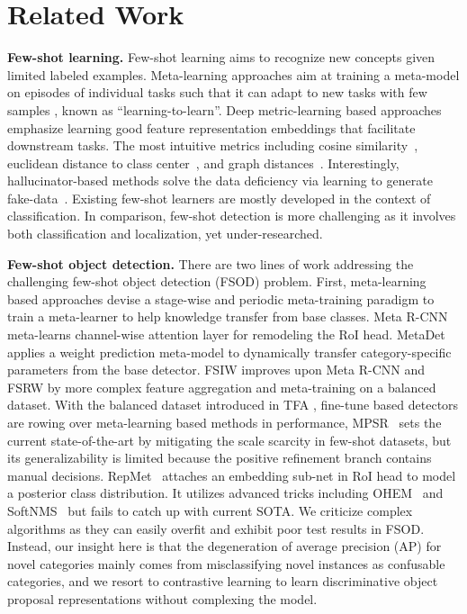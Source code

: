 \documentclass[final]{cvpr}
\begin{document}
\section{Related Work}

\textbf{Few-shot learning.} Few-shot learning aims to recognize new concepts given limited labeled examples. Meta-learning approaches aim at training a meta-model on episodes of individual tasks such that it can adapt to new tasks with few samples \cite{finn_model-agnostic_2017,ren_meta-learning_2018,sun_meta-transfer_nodate,khodadadeh_unsupervised_2019,ravi_optimization_2017,nichol_reptile_nodate,rusu_meta-learning_2018}, known as ``learning-to-learn''. Deep metric-learning based approaches emphasize learning good feature representation embeddings that facilitate downstream tasks. The most intuitive metrics including cosine similarity~\cite{cos_face,cos_softmax,chen_closer_2020,deng_arcface_2019}, euclidean distance to class center~\cite{snell_prototypical_2017}, and graph distances~\cite{garcia_few-shot_2018}. Interestingly, hallucinator-based methods solve the data deficiency via learning to generate fake-data~\cite{wang_low-shot_2018}. Existing few-shot learners are mostly developed in the context of classification. In comparison, few-shot detection is more challenging as it involves both classification and localization, yet under-researched.

\textbf{Few-shot object detection.} There are two lines of work addressing the challenging few-shot object detection (FSOD) problem. First, meta-learning based approaches devise a stage-wise and periodic meta-training paradigm to train a meta-learner to help knowledge transfer from base classes. Meta R-CNN \cite{yan_meta_2020} meta-learns channel-wise attention layer for remodeling the RoI head. MetaDet \cite{wang_meta-learning_2019} applies a weight prediction meta-model to dynamically transfer category-specific parameters from the base detector. FSIW \cite{xiao_few_shot_2020} improves upon Meta R-CNN and FSRW \cite{kang_few-shot_2019} by more complex feature aggregation and meta-training on a balanced dataset. With the balanced dataset introduced in TFA \cite{wang_frustratingly_2020}, fine-tune based detectors are rowing over meta-learning based methods in performance, MPSR~\cite{wu_multi-scale_2020} sets the current state-of-the-art by mitigating the scale scarcity in few-shot datasets, but its generalizability is limited because the positive refinement branch contains manual decisions. RepMet~\cite{karlinsky_repmet_2018} attaches an embedding sub-net in RoI head to model a posterior class distribution. It utilizes advanced tricks including OHEM~\cite{shrivastava_training_2016} and SoftNMS~\cite{bodla_soft-nms_2017} but fails to catch up with current SOTA. We criticize complex algorithms as they can easily overfit and exhibit poor test results in FSOD. Instead, our insight here is that the degeneration of average precision (AP) for novel categories mainly comes from misclassifying novel instances as confusable categories, and we resort to contrastive learning to learn discriminative object proposal representations without complexing the model.
\end{document}
